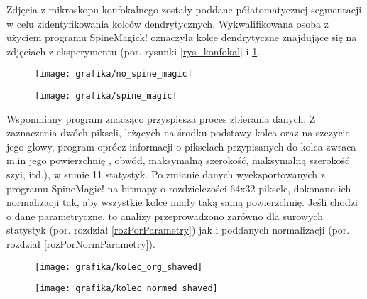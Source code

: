 \documentclass{article}
\begin{document}
Zdjęcia z mikroskopu konfokalnego zostały poddane półatomatycznej segmentacji w celu zidentyfikowania kolców dendrytycznych. 
Wykwalifikowana osoba z użyciem programu SpineMagick! oznaczyła kolce dendrytyczne znajdujące się na zdjęciach z eksperymentu (por. rysunki \ref{rys_konfokal} i \ref{rys_spine_magick}.
\begin{figure}
\centering
\begin{minipage}{.4\textwidth}
  \centering
  \texttt{[image: grafika/no\_spine\_magic]}
  \label{rys_konfokal}
\end{minipage}%
\hspace{1cm}
\begin{minipage}{.4\textwidth}
  \centering
  \texttt{[image: grafika/spine\_magic]}
  \label{rys_spine_magick}
\end{minipage}
\end{figure}
Wspomniany program znacząco przyspiesza proces zbierania danych.
Z zaznaczenia dwóch pikseli, leżących na środku podstawy kolca oraz na szczycie jego głowy, program oprócz informacji o pikselach przypisanych do kolca zwraca m.in jego powierzchnię , obwód, maksymalną szerokość, maksymalną szerokość szyi, itd.), w sumie 11 statystyk.
Po zmianie danych wyeksportowanych z programu SpineMagic! na bitmapy o rozdzielczości 64x32 piksele, dokonano ich normalizacji tak, aby wszystkie kolce miały taką samą powierzchnię.
Jeśli chodzi o dane parametryczne, to analizy przeprowadzono zarówno dla surowych statystyk (por. rozdział \ref{rozPorParametry}) jak i poddanych normalizacji (por. rozdział \ref{rozPorNormParametry}).

\begin{figure}
\centering
\begin{minipage}[t]{.4\textwidth}
  \vspace{0pt}
  \texttt{[image: grafika/kolec\_org\_shaved]}
  \label{rysBitmapaOrg}
\end{minipage}%
\hspace{1cm}
\begin{minipage}[t]{.4\textwidth}
  \vspace{0pt}\raggedright
  \centering
  \texttt{[image: grafika/kolec\_normed\_shaved]}
  \label{rysBitmapaNormed}
\end{minipage}
\end{figure}
\end{document}
